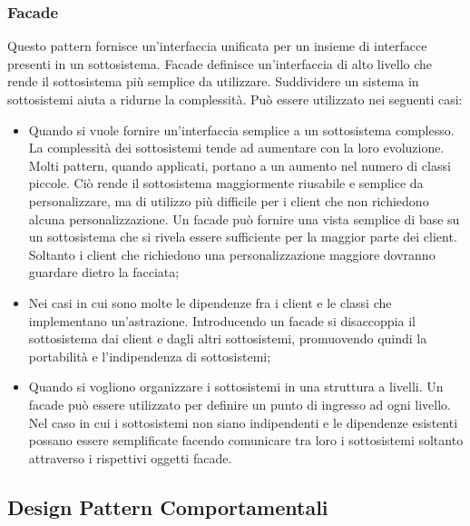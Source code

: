 \documentclass[12pt,a4paper]{article}
\begin{document}
\subsubsection{Facade}
Questo pattern fornisce un’interfaccia unificata per un insieme di interfacce presenti in un sottosistema. Facade definisce un’interfaccia di alto livello che rende il sottosistema più semplice da utilizzare. Suddividere un sistema in sottosistemi aiuta a ridurne la complessità. Può essere utilizzato nei seguenti casi:
\begin{itemize}
	\item Quando si vuole fornire un’interfaccia semplice a un sottosistema complesso. La complessità dei sottosistemi tende ad aumentare con la loro evoluzione. Molti pattern, quando applicati, portano a un aumento nel numero di classi piccole. Ciò rende il sottosistema maggiormente riusabile e semplice da personalizzare, ma di utilizzo più difficile per i client che non richiedono alcuna personalizzazione. Un facade può fornire una vista semplice di base su un sottosistema che si rivela essere sufficiente per la maggior parte dei client. Soltanto i client che richiedono una personalizzazione maggiore dovranno guardare dietro la facciata;
	\item Nei casi in cui sono molte le dipendenze fra i client e le classi che implementano un’astrazione. Introducendo un facade si disaccoppia il sottosistema dai client e dagli altri sottosistemi, promuovendo quindi la portabilità e l’indipendenza di sottosistemi;
	\item Quando si vogliono organizzare i sottosistemi in una struttura a livelli. Un facade può essere utilizzato per definire un punto di ingresso ad ogni livello. Nel caso in cui i sottosistemi non siano indipendenti e le dipendenze esistenti possano essere semplificate facendo comunicare tra loro i sottosistemi soltanto attraverso i rispettivi oggetti facade.
\end{itemize}

\subsection{Design Pattern Comportamentali}
\end{document}
